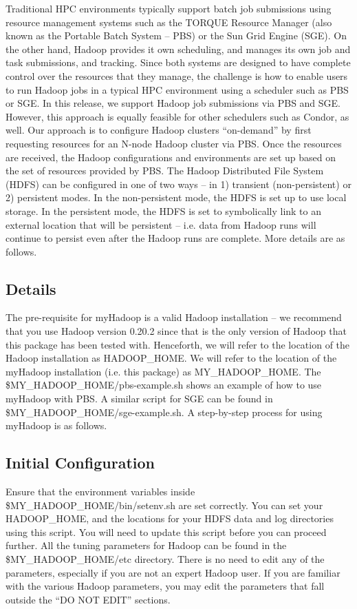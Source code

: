 \documentclass{article}
\begin{document}
Traditional HPC environments typically support batch job submissions using resource
management systems such as the TORQUE Resource Manager (also known as the
Portable Batch System – PBS) or the Sun Grid Engine (SGE). On the other hand, Hadoop
provides it own scheduling, and manages its own job and task submissions, and tracking.
Since both systems are designed to have complete control over the resources that they
manage, the challenge is how to enable users to run Hadoop jobs in a typical HPC
environment using a scheduler such as PBS or SGE. In this release, we support Hadoop
job submissions via PBS and SGE. However, this approach is equally feasible for other
schedulers such as Condor, as well.
Our approach is to configure Hadoop clusters “on-demand” by first requesting resources
for an N-node Hadoop cluster via PBS. Once the resources are received, the Hadoop
configurations and environments are set up based on the set of resources provided by
PBS. The Hadoop Distributed File System (HDFS) can be configured in one of two ways
– in 1) transient (non-persistent) or 2) persistent modes. In the non-persistent mode, the
HDFS is set up to use local storage. In the persistent mode, the HDFS is set to
symbolically link to an external location that will be persistent – i.e. data from Hadoop
runs will continue to persist even after the Hadoop runs are complete. More details are as
follows.

\subsection{Details}

The pre-requisite for myHadoop is a valid Hadoop installation – we recommend that you
use Hadoop version 0.20.2 since that is the only version of Hadoop that this package has
been tested with. Henceforth, we will refer to the location of the Hadoop installation as
HADOOP\_HOME. We will refer to the location of the myHadoop installation (i.e. this
package) as MY\_HADOOP\_HOME. The \$MY\_HADOOP\_HOME/pbs-example.sh shows
an example of how to use myHadoop with PBS. A similar script for SGE can be found in
\$MY\_HADOOP\_HOME/sge-example.sh.
A step-by-step process for using myHadoop is as follows.

\subsection{Initial Configuration}

Ensure that the environment variables inside \$MY\_HADOOP\_HOME/bin/setenv.sh are
set correctly. You can set your HADOOP\_HOME, and the locations for your HDFS data
and log directories using this script. You will need to update this script before you can
proceed further.
All the tuning parameters for Hadoop can be found in the \$MY\_HADOOP\_HOME/etc
directory. There is no need to edit any of the parameters, especially if you are not an
expert Hadoop user. If you are familiar with the various Hadoop parameters, you may
edit the parameters that fall outside the “DO NOT EDIT” sections.
\end{document}
